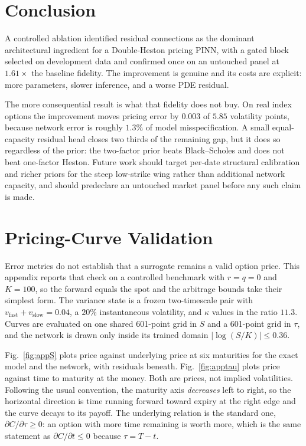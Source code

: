 \documentclass[conference]{IEEEtran}
\begin{document}
\section{Conclusion}

A controlled ablation identified residual connections as the dominant
architectural ingredient for a Double-Heston pricing PINN, with a gated block
selected on development data and confirmed once on an untouched panel at
$1.61\times$ the baseline fidelity. The improvement is genuine and its costs
are explicit: more parameters, slower inference, and a worse PDE residual.

The more consequential result is what that fidelity does not buy. On real
index options the improvement moves pricing error by $0.003$ of $5.85$
volatility points, because network error is roughly $1.3\%$ of model
misspecification. A small equal-capacity residual head closes two thirds of the
remaining gap, but it does so regardless of the prior: the two-factor prior
beats Black--Scholes and does not beat one-factor Heston. Future work should
target per-date structural calibration and richer priors for the steep
low-strike wing rather than additional network capacity, and should predeclare
an untouched market panel before any such claim is made.

\appendices

\section{Pricing-Curve Validation}
\label{app:curves}

Error metrics do not establish that a surrogate remains a valid option price.
This appendix reports that check on a controlled benchmark with $r=q=0$ and
$K=100$, so the forward equals the spot and the arbitrage bounds take their
simplest form. The variance state is a frozen two-timescale pair with
$v_{\text{fast}}+v_{\text{slow}}=0.04$, a $20\%$ instantaneous volatility, and
$\kappa$ values in the ratio $11.3$. Curves are evaluated on one shared
601-point grid in $S$ and a 601-point grid in $\tau$, and the network is drawn
only inside its trained domain $|\log(S/K)|\le0.36$.

Fig.~\ref{fig:appS} plots price against underlying price at six maturities for
the exact model and the network, with residuals beneath.
Fig.~\ref{fig:apptau} plots price against time to maturity at the money. Both
are prices, not implied volatilities. Following the usual convention, the
maturity axis \emph{decreases} left to right, so the horizontal direction is
time running forward toward expiry at the right edge and the curve decays to
its payoff. The underlying relation is the standard one,
$\partial C/\partial\tau\ge0$: an option with more time remaining is worth
more, which is the same statement as $\partial C/\partial t\le0$ because
$\tau=T-t$.
\end{document}
